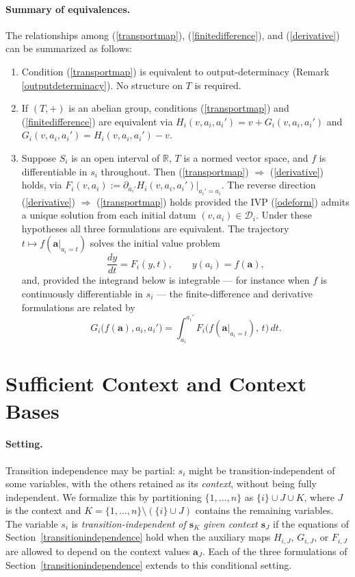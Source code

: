 \documentclass{article}
\theoremstyle{definition}
\theoremstyle{remark}
\begin{document}
\paragraph{Summary of equivalences.} The relationships among (\ref{transportmap}), (\ref{finitedifference}), and (\ref{derivative}) can be summarized as follows:
\begin{enumerate}[label=(\alph*)]
\item Condition (\ref{transportmap}) is equivalent to output-determinacy (Remark \ref{outputdeterminacy}). No structure on $T$ is required.
\item If $(T, +)$ is an abelian group, conditions (\ref{transportmap}) and (\ref{finitedifference}) are equivalent via $H_i(v, a_i, a_i') = v + G_i(v, a_i, a_i')$ and $G_i(v, a_i, a_i') = H_i(v, a_i, a_i') - v$.
\item Suppose $S_i$ is an open interval of $\mathbb{R}$, $T$ is a normed vector space, and $f$ is differentiable in $s_i$ throughout. Then (\ref{transportmap}) $\Rightarrow$ (\ref{derivative}) holds, via $F_i(v, a_i) := \partial_{a_i'} H_i(v, a_i, a_i')\big|_{a_i' = a_i}$. The reverse direction (\ref{derivative}) $\Rightarrow$ (\ref{transportmap}) holds provided the IVP (\ref{odeform}) admits a unique solution from each initial datum $(v, a_i) \in \mathcal{D}_i$. Under these hypotheses all three formulations are equivalent. The trajectory $t \mapsto f(\boldsymbol{a}|_{a_i = t})$ solves the initial value problem
\[
\frac{dy}{dt} = F_i(y, t), \qquad y(a_i) = f(\boldsymbol{a}),
\]
and, provided the integrand below is integrable --- for instance when $f$ is continuously differentiable in $s_i$ --- the finite-difference and derivative formulations are related by
\begin{equation}
\label{integralform}
G_i\bigl(f(\boldsymbol{a}), a_i, a_i'\bigr) = \int_{a_i}^{a_i'} F_i\bigl(f(\boldsymbol{a}|_{a_i = t}),\, t\bigr)\, dt.
\end{equation}
\end{enumerate}

\newpage

\section{Sufficient Context and Context Bases}
\label{contextbases}

\paragraph{Setting.} Transition independence may be partial: $s_i$ might be transition-independent of some variables, with the others retained as its \textit{context}, without being fully independent. We formalize this by partitioning $\{1, \ldots, n\}$ as $\{i\} \cup J \cup K$, where $J$ is the context and $K = \{1, \ldots, n\} \setminus (\{i\} \cup J)$ contains the remaining variables. The variable $s_i$ is \textit{transition-independent of $\boldsymbol{s}_K$ given context $\boldsymbol{s}_J$} if the equations of Section~\ref{transitionindependence} hold when the auxiliary maps $H_{i,J}$, $G_{i,J}$, or $F_{i,J}$ are allowed to depend on the context values $\boldsymbol{a}_J$. Each of the three formulations of Section~\ref{transitionindependence} extends to this conditional setting.
\end{document}
